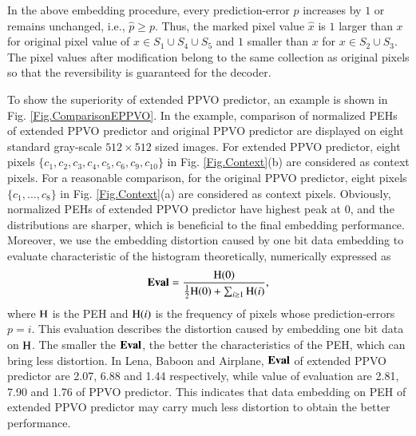 \documentclass[review,3p,10pt,sort&compress]{elsarticle}
\begin{document}
In the above embedding procedure, every prediction-error $p$ increases by $1$ or remains unchanged, i.e., $\hat{p} \geq p$.
Thus, the marked pixel value $\hat{x}$ is $1$ larger than $x$ for original pixel value of $x \in S_1 \cup S_4 \cup S_5$ and $1$ smaller than $x$ for $x \in S_2 \cup S_3$.
The pixel values after modification belong to the same collection as original pixels so that the reversibility is guaranteed for the decoder.

To show the superiority of extended PPVO predictor, an example is shown in Fig. \ref{Fig.ComparisonEPPVO}. In the example, comparison of normalized PEHs of extended PPVO predictor and original PPVO predictor are displayed on eight standard gray-scale $512 \times 512$ sized images. For extended PPVO predictor, eight pixels $\{c_{1}, c_{2}, c_{3}, c_{4}, c_{5}, c_{6}, c_{9}, c_{10}\}$ in Fig. \ref{Fig.Context}(b) are considered as context pixels. For a reasonable comparison, for the original PPVO predictor, eight pixels $\{c_{1}, ..., c_{8}\}$ in Fig. \ref{Fig.Context}(a) are considered as context pixels.
Obviously, normalized PEHs of extended PPVO predictor have highest peak at $0$, and the distributions are sharper, which is beneficial to the final embedding performance. Moreover, we use the embedding distortion caused by one bit data embedding to evaluate characteristic of the histogram theoretically, numerically expressed as
\begin{equation*}\label{eq:EvaluateHistogram}
{\rm \mathbf{Eval}} = \frac{{\rm H}(0)}{\frac{1}{2}{\rm H}(0)+ \sum_{i \geq 1}{\rm H}(i)},
\end{equation*}
where ${\rm H}$ is the PEH and ${\rm H}(i)$ is the frequency of pixels whose prediction-errors $p = i$. This evaluation describes the distortion caused by embedding one bit data on ${\rm H}$. The smaller the ${\rm \mathbf{Eval}}$, the better the characteristics of the PEH, which can bring less distortion. In Lena, Baboon and Airplane, ${\rm \mathbf{Eval}}$ of extended PPVO predictor are 2.07, 6.88 and 1.44 respectively, while value of evaluation are 2.81, 7.90 and 1.76 of PPVO predictor. This indicates that data embedding on PEH of extended PPVO predictor may carry much less distortion to obtain the better performance.
\end{document}
